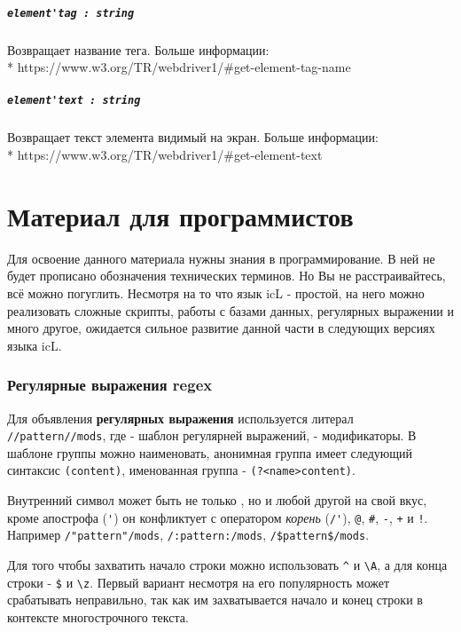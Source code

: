 \documentclass[a4paper, 14pt]{extarticle}
\begin{document}
\subsubsection{\lstinline|element'tag : string|}

Возвращает название тега. Больше информации: \\* https://www.w3.org/TR/webdriver1/\#get-element-tag-name

\subsubsection{\lstinline|element'text : string|}

Возвращает текст элемента видимый на экран. Больше информации: \\* https://www.w3.org/TR/webdriver1/\#get-element-text

\newpage
\part{Материал для программистов}

Для освоение данного материала нужны знания в программирование. В ней не будет прописано обозначения технических терминов. Но Вы не расстраивайтесь, всё можно погуглить. Несмотря на то что язык icL - простой, на него можно реализовать сложные скрипты, работы с базами данных, регулярных выражении и много другое, ожидается сильное развитие данной части в следующих версиях языка icL.

\section{Регулярные выражения {\color{bluemarin} regex}}
\label{regex}

Для объявления {\bf регулярных выражения} используется литерал \lstinline|//pattern//mods|, где  - шаблон регулярней выражений,  - модификаторы. В шаблоне группы можно наименовать, анонимная группа имеет следующий синтаксис \lstinline|(content)|, именованная группа - \lstinline|(?<name>content)|.

Внутренний символ может быть не только \code{/}, но и любой другой на свой вкус, кроме апострофа (\lstinline|'|) он конфликтует с оператором {\it корень} (\lstinline|/'|), \lstinline|@|, \lstinline|#|, \lstinline|-|, \lstinline|+| и \lstinline|!|. Например  \lstinline|/"pattern"/mods|, \lstinline|/:pattern:/mods|, \lstinline|/$pattern$/mods|.

Для того чтобы захватить начало строки можно использовать \lstinline|^| и \lstinline|\A|, а для конца строки - \lstinline|$| и \lstinline|\z|. Первый вариант несмотря на его популярность может срабатывать неправильно, так как им захватывается начало и конец строки в контексте многострочного текста.
\end{document}

